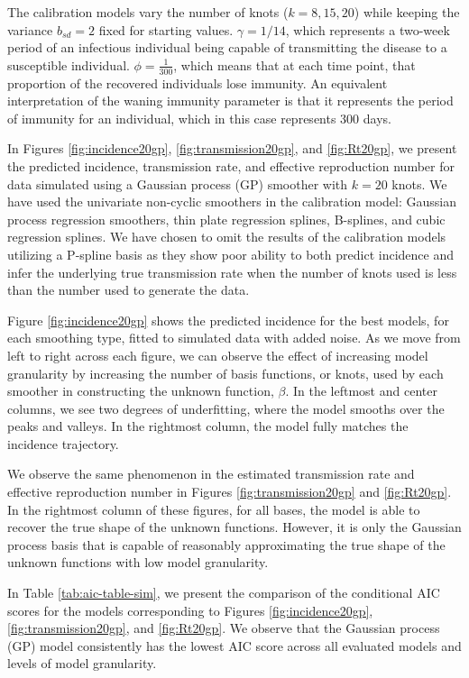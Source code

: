 \documentclass[
11pt, %
oneside, %
english, %
singlespacing, %
]{macthesis} %
\begin{document}
The calibration models vary the number of knots (\(k = 8, 15, 20\)) while keeping the variance \(b_{sd} = 2\) fixed for starting values. \(\gamma = 1/14\), which represents a two-week period of an infectious individual being capable of transmitting the disease to a susceptible individual. \(\phi = \frac{1}{300}\), which means that at each time point, that proportion of the recovered individuals lose immunity. An equivalent interpretation of the waning immunity parameter is that it represents the period of immunity for an individual, which in this case represents 300 days.

In Figures \ref{fig:incidence20gp}, \ref{fig:transmission20gp}, and \ref{fig:Rt20gp}, we present the predicted incidence, transmission rate, and effective reproduction number for data simulated using a Gaussian process (GP) smoother with \(k=20\) knots. We have used the univariate non-cyclic smoothers in the calibration model: Gaussian process regression smoothers, thin plate regression splines, B-splines, and cubic regression splines. We have chosen to omit the results of the calibration models utilizing a P-spline basis as they show poor ability to both predict incidence and infer the underlying true transmission rate when the number of knots used is less than the number used to generate the data.

Figure \ref{fig:incidence20gp} shows the predicted incidence for the best models, for each smoothing type, fitted to simulated data with added noise. As we move from left to right across each figure, we can observe the effect of increasing model granularity by increasing the number of basis functions, or knots, used by each smoother in constructing the unknown function, \(\beta\). In the leftmost and center columns, we see two degrees of underfitting, where the model smooths over the peaks and valleys. In the rightmost column, the model fully matches the incidence trajectory.

We observe the same phenomenon in the estimated transmission rate and effective reproduction number in Figures \ref{fig:transmission20gp} and \ref{fig:Rt20gp}. In the rightmost column of these figures, for all bases, the model is able to recover the true shape of the unknown functions. However, it is only the Gaussian process basis that is capable of reasonably approximating the true shape of the unknown functions with low model granularity.

In Table \ref{tab:aic-table-sim}, we present the comparison of the conditional AIC scores for the models corresponding to Figures \ref{fig:incidence20gp}, \ref{fig:transmission20gp}, and \ref{fig:Rt20gp}. We observe that the Gaussian process (GP) model consistently has the lowest AIC score across all evaluated models and levels of model granularity.
\end{document}
